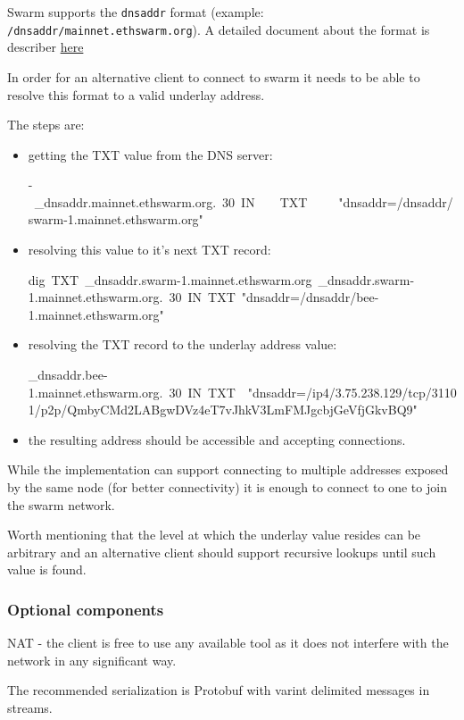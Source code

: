 Swarm supports the \texttt{dnsaddr} format (example:
\texttt{/dnsaddr/mainnet.ethswarm.org}). A detailed document about the
format is describer
\href{https://github.com/libp2p/specs/blob/master/addressing/README.md\#dnsaddr-links}{here}

In order for an alternative client to connect to swarm it needs to be able to resolve this format to a valid underlay address.

The steps are:
\begin{itemize}
\tightlist
\item
    getting the TXT value from the DNS server:

    \noindent -\ \_dnsaddr.mainnet.ethswarm.org.\ 30\ IN\ \ \ \ TXT\ \ \ \ \ "dnsaddr=/dnsaddr/swarm-1.mainnet.ethswarm.org"   
\item
  resolving this value to it's next TXT record:

  \noindent dig\ TXT\ \_dnsaddr.swarm-1.mainnet.ethswarm.org\ \_dnsaddr.swarm-1.mainnet.ethswarm.org.\ 30\ IN\ TXT\ "dnsaddr=/dnsaddr/bee-1.mainnet.ethswarm.org"
\item
  resolving the TXT record to the underlay address value:

   \noindent \_dnsaddr.bee-1.mainnet.ethswarm.org.\ 30\ IN\ TXT\ \ "dnsaddr=/ip4/3.75.238.129/tcp/31101/p2p/QmbyCMd2LABgwDVz4eT7vJhkV3LmFMJgcbjGeVfjGkvBQ9"
\item
  the resulting address should be accessible and accepting connections.
\end{itemize}

While the implementation can support connecting to multiple addresses
exposed by the same node (for better connectivity) it is enough to
connect to one to join the swarm network.

Worth mentioning that the level at which the underlay value resides can
be arbitrary and an alternative client should support recursive lookups
until such value is found.

\subsubsection{Optional components}\label{optional-components}

NAT - the client is free to use any available tool as it does not
interfere with the network in any significant way.

The recommended serialization is Protobuf with varint delimited messages
in streams.